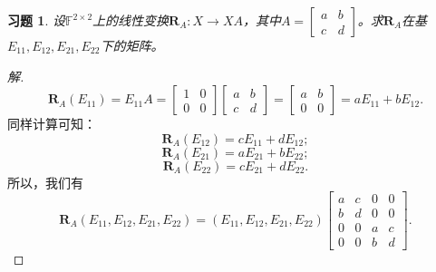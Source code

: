\documentclass[UTF8]{ctexart}
\newtheorem{ex}[thm]{习题}
\begin{document}
\begin{ex}
设$\mathbb{F}^{2 \times 2}$上的线性变换$\mathbf{R}_A: X \to XA$，其中$A = \begin{bmatrix} 
a & b \\
c & d
\end{bmatrix}$。求$\mathbf{R}_A$在基$E_{11}, E_{12}, E_{21}, E_{22}$下的矩阵。
\end{ex}
\begin{proof}[解]
\begin{equation} \nonumber
\mathbf{R}_A(E_{11}) = E_{11}A = \begin{bmatrix} 
1 & 0 \\
0 & 0
\end{bmatrix}\begin{bmatrix} 
a & b \\
c & d
\end{bmatrix} = \begin{bmatrix} 
a & b \\
0 & 0
\end{bmatrix} = aE_{11} + bE_{12}.
\end{equation}
同样计算可知：
\begin{equation} \nonumber
\mathbf{R}_A(E_{12}) = cE_{11} + dE_{12};
\end{equation}
\begin{equation} \nonumber
\mathbf{R}_A(E_{21}) = aE_{21} + bE_{22};
\end{equation}
\begin{equation} \nonumber
\mathbf{R}_A(E_{22}) = cE_{21} + dE_{22}.
\end{equation}
所以，我们有
\begin{equation} \nonumber
\mathbf{R}_A(E_{11}, E_{12}, E_{21}, E_{22}) = (E_{11}, E_{12}, E_{21}, E_{22})
\begin{bmatrix} 
a & c & 0 & 0 \\
b & d & 0 & 0 \\
0 & 0 & a & c \\
0 & 0 & b & d
\end{bmatrix}.
\end{equation}
\end{proof}
\end{document}
